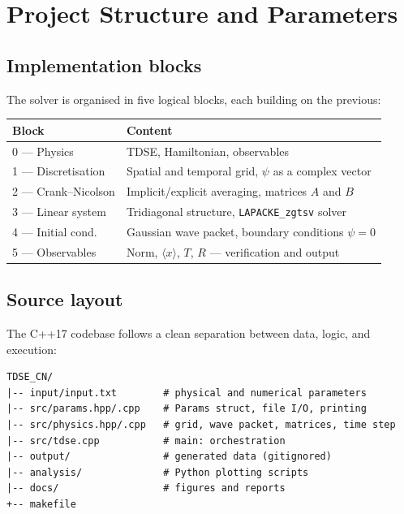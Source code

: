\documentclass[a4paper,12pt]{article}
\begin{document}
\section{Project Structure and Parameters}

\subsection{Implementation blocks}

The solver is organised in five logical blocks, each building on the previous:

\vskip 2mm
\begin{center}
\begin{tabular}{ll}
  \toprule
  Block & Content \\
  \midrule
  0 — Physics        & TDSE, Hamiltonian, observables \\
  1 — Discretisation & Spatial and temporal grid, $\psi$ as a complex vector \\
  2 — Crank--Nicolson & Implicit/explicit averaging, matrices $A$ and $B$ \\
  3 — Linear system  & Tridiagonal structure, \texttt{LAPACKE\_zgtsv} solver \\
  4 — Initial cond.  & Gaussian wave packet, boundary conditions $\psi = 0$ \\
  5 — Observables    & Norm, $\langle x\rangle$, $T$, $R$ — verification and output \\
  \bottomrule
\end{tabular}
\end{center}
\vskip 2mm

\subsection{Source layout}

The C++17 codebase follows a clean separation between data, logic, and
execution:
\begin{verbatim}
TDSE_CN/
|-- input/input.txt        # physical and numerical parameters
|-- src/params.hpp/.cpp    # Params struct, file I/O, printing
|-- src/physics.hpp/.cpp   # grid, wave packet, matrices, time step
|-- src/tdse.cpp           # main: orchestration
|-- output/                # generated data (gitignored)
|-- analysis/              # Python plotting scripts
|-- docs/                  # figures and reports
+-- makefile
\end{verbatim}
\end{document}
